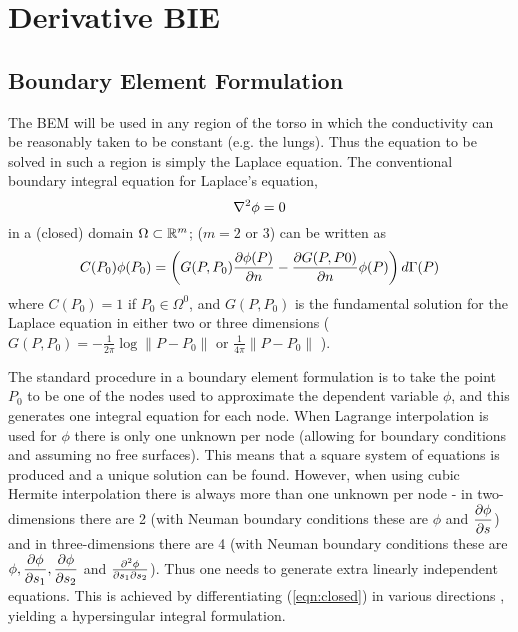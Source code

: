 \chapter{Derivative BIE}

\section{Boundary Element Formulation}

The BEM will be used in any region of the torso in which the conductivity can
be reasonably taken to be constant (e.g. the lungs).  Thus the equation to be
solved in such a region is simply the Laplace equation.  The conventional
boundary integral equation for Laplace's equation, 
\begin{equation}
  \laplacian{}{\phi} = 0
  \label{eqn:Laplace}
\end{equation}
in a (closed) domain $\Omega \subset  \mathbb{R} ^{m}$; ($m=2$ or $3$) can be written as
\begin{equation}
  C(P_{0})\phi(P_{0}) =
  \left(G(P,P_{0}) \dfrac{\partial \phi(P)}{\partial n} - \dfrac{\partial G(P,P0)}{\partial n} \phi(P)\right)
  d\Gamma(P)
  \label{eqn:closed}
\end{equation}
where $C(P_{0}) = 1$ if $P_{0}\in \Omega^{0}$, and $G(P,P_{0})$ is the
fundamental solution for the Laplace equation in either two or three
dimensions (\ie $G(P,P_{0}) = -\frac{1}{2\pi}\log \parallel P
-P_{0}\parallel$ or $\frac{1}{4\pi}\parallel P-P_{0}\parallel$ ).

The standard procedure in a boundary element formulation is to take the point
$P_{0}$ to be one of the nodes used to approximate the dependent variable
$\phi$, and this generates one integral equation for each node.  When Lagrange
interpolation is used for $\phi$ there is only one unknown per node (allowing
for boundary conditions and assuming no free surfaces). This means that a
square system of equations is produced and a unique solution can be found.
However, when using cubic Hermite interpolation there is always more than one
unknown per node - in two-dimensions there are 2 (with Neuman boundary
conditions these are $\phi$ and $ \dfrac{\partial \phi}{\partial s} $) and in three-dimensions
there are 4 (with Neuman boundary conditions these are $\phi,
 \dfrac{\partial \phi}{\partial s_{1}} ,  \dfrac{\partial \phi}{\partial s_{2}} $ and $\frac{\partial^{2}\phi}{\partial
  s_{1}\partial s_{2}}$).  Thus one needs to generate extra linearly independent
equations.  This is achieved by differentiating (\ref{eqn:closed}) in various
directions \cite{tomlinson:1996}, yielding a hypersingular integral
formulation.

